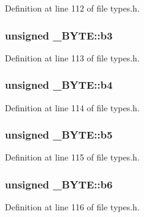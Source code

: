 Definition at line 112 of file types.\+h.

\subsubsection[{\texorpdfstring{b3}{b3}}]{\setlength{\rightskip}{0pt plus 5cm}unsigned \+\_\+\+B\+Y\+T\+E\+::b3}\hypertarget{union___b_y_t_e_a2a6397723a423e94b0b2115fcbd8602b}{}\label{union___b_y_t_e_a2a6397723a423e94b0b2115fcbd8602b}


Definition at line 113 of file types.\+h.

\subsubsection[{\texorpdfstring{b4}{b4}}]{\setlength{\rightskip}{0pt plus 5cm}unsigned \+\_\+\+B\+Y\+T\+E\+::b4}\hypertarget{union___b_y_t_e_a9f7be60ef7715bb8d228596b776a9878}{}\label{union___b_y_t_e_a9f7be60ef7715bb8d228596b776a9878}


Definition at line 114 of file types.\+h.

\subsubsection[{\texorpdfstring{b5}{b5}}]{\setlength{\rightskip}{0pt plus 5cm}unsigned \+\_\+\+B\+Y\+T\+E\+::b5}\hypertarget{union___b_y_t_e_aac0c6f560365fe81cf06fb3e6ce4e043}{}\label{union___b_y_t_e_aac0c6f560365fe81cf06fb3e6ce4e043}


Definition at line 115 of file types.\+h.

\subsubsection[{\texorpdfstring{b6}{b6}}]{\setlength{\rightskip}{0pt plus 5cm}unsigned \+\_\+\+B\+Y\+T\+E\+::b6}\hypertarget{union___b_y_t_e_a134880ab6d39747298c0813b024f62b2}{}\label{union___b_y_t_e_a134880ab6d39747298c0813b024f62b2}


Definition at line 116 of file types.\+h.

